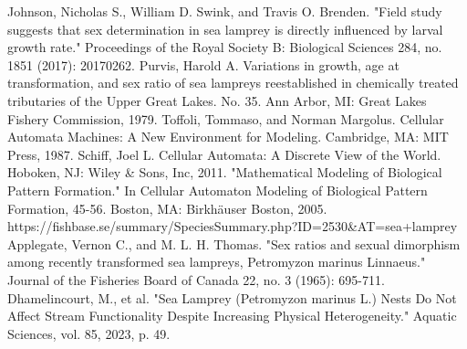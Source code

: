 \documentclass{mcmthesis}
\begin{document}
\begin{thebibliography}{99}
 Johnson, Nicholas S., William D. Swink, and Travis O. Brenden. "Field study suggests that sex determination in sea lamprey is directly influenced by larval growth rate." Proceedings of the Royal Society B: Biological Sciences 284, no. 1851 (2017): 20170262.
 Purvis, Harold A. Variations in growth, age at transformation, and sex ratio of sea lampreys reestablished in chemically treated tributaries of the Upper Great Lakes. No. 35. Ann Arbor, MI: Great Lakes Fishery Commission, 1979.
 Toffoli, Tommaso, and Norman Margolus. Cellular Automata Machines: A New Environment for Modeling. Cambridge, MA: MIT Press, 1987.
 Schiff, Joel L. Cellular Automata: A Discrete View of the World. Hoboken, NJ: Wiley \& Sons, Inc, 2011.
 "Mathematical Modeling of Biological Pattern Formation." In Cellular Automaton Modeling of Biological Pattern Formation, 45-56. Boston, MA: Birkhäuser Boston, 2005.
 https://fishbase.se/summary/SpeciesSummary.php?ID=2530\&AT=sea+lamprey
  Applegate, Vernon C., and M. L. H. Thomas. "Sex ratios and sexual dimorphism among recently transformed sea lampreys, Petromyzon marinus Linnaeus." Journal of the Fisheries Board of Canada 22, no. 3 (1965): 695-711.
 Dhamelincourt, M., et al. "Sea Lamprey (Petromyzon marinus L.) Nests Do Not Affect Stream Functionality Despite Increasing Physical Heterogeneity." Aquatic Sciences, vol. 85, 2023, p. 49. 
\end{thebibliography}
\end{document}
